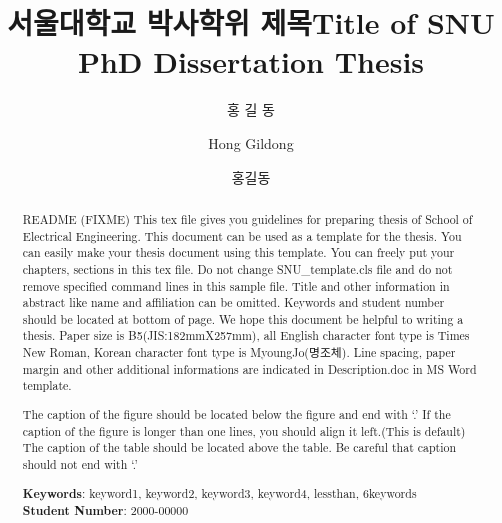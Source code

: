 \documentclass[doctor]{snuee}
\title[korean]{서울대학교 박사학위 제목}                %
\title[english]{Title of SNU PhD Dissertation Thesis} %
\author[korean]{홍 길 동}      %
\author[english]{Hong Gildong} %
\author[nospace]{홍길동}       %
\begin{document}
\renewcommand{\baselinestretch}{1.5}    %
\selectfont                             

\begin{abstract}
	\par %
	README (FIXME)
	This tex file gives you guidelines for preparing thesis of School of Electrical Engineering.
	This document can be used as a template for the thesis.
	You can easily make your thesis document using this template. You can freely put your chapters,
	sections in this tex file.
	Do not change SNU\_template.cls file and do not remove specified
	command lines in this sample file.
	Title and other information in abstract like name and affiliation can be
	omitted. Keywords and student number should be located at bottom of
	page. We hope this document be helpful to writing a thesis. Paper
	size is B5(JIS:182mmX257mm), all English character font type is
	Times New Roman, Korean character font type is MyoungJo(명조체).
	Line spacing, paper margin and other additional informations are
	indicated in Description.doc in MS Word template.

	The caption of the figure should be located below the figure and end with `.'
	If the caption of the figure is longer than one lines, you should align it left.(This is default)
	The caption of the table should be located above the table. Be careful that caption should not end with `.'
	\vfill
	\begin{minipage}[t][20mm][b]{\textwidth}
		{\bfseries Keywords}: keyword1, keyword2, keyword3, keyword4, lessthan, 6keywords \\ %
		{\bfseries Student Number}: 2000-00000\\                        %
	\end{minipage}
	
\end{abstract}

\changepage{5mm}{}{}{}{}{}{}{}{-5mm}    %
\makelists   %

\end{document}

